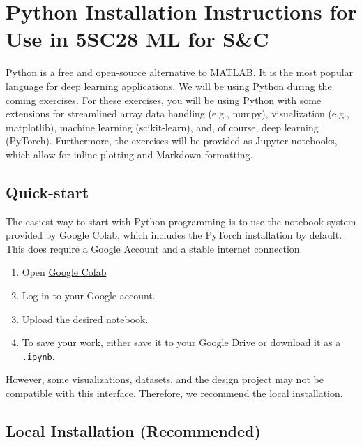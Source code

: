 \documentclass[a4paper]{article}
\begin{document}
\section*{Python Installation Instructions for Use in 5SC28 ML for S\&C}

Python is a free and open-source alternative to MATLAB. It is the most popular language for deep learning applications. We will be using Python during the coming exercises. For these exercises, you will be using Python with some extensions for streamlined array data handling (e.g., numpy), visualization (e.g., matplotlib), machine learning (scikit-learn), and, of course, deep learning (PyTorch). Furthermore, the exercises will be provided as Jupyter notebooks, which allow for inline plotting and Markdown formatting.

\subsection*{Quick-start}

The easiest way to start with Python programming is to use the notebook system provided by Google Colab, which includes the PyTorch installation by default. This does require a Google Account and a stable internet connection.
\begin{enumerate}[label=\arabic*.]
    \item Open \href{https://colab.research.google.com/}{Google Colab}
    \item Log in to your Google account.
    \item Upload the desired notebook.
    \item To save your work, either save it to your Google Drive or download it as a \texttt{.ipynb}.
\end{enumerate}

However, some visualizations, datasets, and the design project may not be compatible with this interface. Therefore, we recommend the local installation.

\subsection*{Local Installation (Recommended)}
\end{document}
